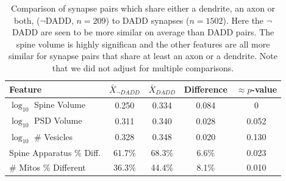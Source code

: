\documentclass[12pt]{article}
\theoremstyle{definition}
\begin{document}



\begin{table}[tb]
  \caption{Comparison of synapse pairs which share either a dendrite, an axon or both, ($\neg$DADD, $n=209$) to DADD synapses ($n=1502$). 
  Here the $\neg$DADD are seen to be more similar on average than DADD pairs. 
  The spine volume is highly significan and the other features are all more similar for synapse pairs that share at least an axon or a dendrite. 
  Note that we did not adjust for multiple comparisons.}
  \label{tab:restVSdadd}
  \begin{center}
    \begin{tabular}{l|cccc}
    \hline

    \hline
Feature                  & $\bar{X}_{\neg DADD}$ & $\bar{X}_{DADD}$ & Difference & $\approx p$-value  \\
    \hline
$\log_{10}$ Spine Volume & 0.250                 & 0.334            & 0.084      & 0     \\
$\log_{10}$ PSD Volume   & 0.311                 & 0.340            & 0.028      & 0.052 \\
$\log_{10}$ \# Vesicles  & 0.328                 & 0.348            & 0.020      & 0.130 \\
Spine Apparatus \% Diff. & 61.7\%                & 68.3\%           & 6.6\%     & 0.023 \\
\# Mitos \% Different    & 36.3\%                & 44.4\%           & 8.1\%     & 0.010 \\
    \hline
    \end{tabular}
  \end{center}
\end{table}






\end{document}
